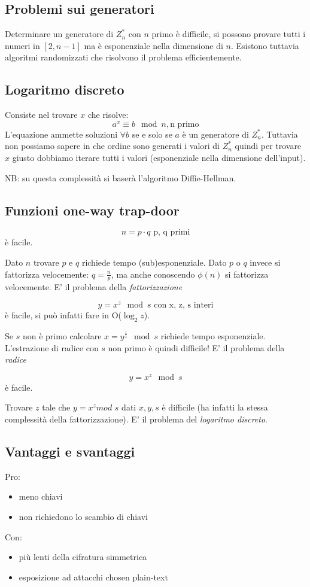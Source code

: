 \subsection{Problemi sui generatori}
Determinare un generatore di $Z_n^*$ con $n$ primo è difficile, si possono provare tutti i numeri in $[2, n-1]$ ma è esponenziale nella dimensione di $n$.
Esistono tuttavia algoritmi randomizzati che risolvono il problema efficientemente.

\subsection{Logaritmo discreto}
Consiste nel trovare $x$ che risolve:
$$ a^x \equiv b \mod n, \text{n primo} $$
L'equazione ammette soluzioni $\forall b$ se e solo se $a$ è un generatore di $Z_n^*$.
Tuttavia non possiamo sapere in che ordine sono generati i valori di $Z_n^*$ quindi per trovare $x$ giusto dobbiamo iterare tutti i valori (esponenziale nella dimensione dell'input).

NB: su questa complessità si baserà l'algoritmo Diffie-Hellman.

\subsection{Funzioni one-way trap-door}
$$ n = p \cdot q \text{ p, q primi} $$
è facile.

Dato $n$ trovare $p$ e $q$ richiede tempo (sub)esponenziale. Dato $p$ o $q$ invece si fattorizza velocemente: $q = \frac{n}{p}$, ma anche conoscendo $\phi(n)$ si fattorizza velocemente. E' il problema della \emph{fattorizzazione}

$$ y = x^z \mod s \text{ con x, z, s interi} $$
è facile, si può infatti fare in O($\log_2z$).

Se $s$ non è primo calcolare $x = y^{\frac{1}{z}} \mod s$ richiede tempo esponenziale.
L'estrazione di radice con $s$ non primo è quindi difficile! E' il problema della \emph{radice}

$$y = x^z \mod s $$
è facile.

Trovare $z$ tale che $y = x^z mod$ $s$ dati $x, y, s$ è difficile (ha infatti la stessa complessità della fattorizzazione). E' il problema del \emph{logaritmo discreto}.

\subsection{Vantaggi e svantaggi}
Pro:
\begin{itemize}
    \item meno chiavi
    \item non richiedono lo scambio di chiavi
\end{itemize}
Con:
\begin{itemize}
    \item più lenti della cifratura simmetrica
    \item esposizione ad attacchi chosen plain-text
\end{itemize}

